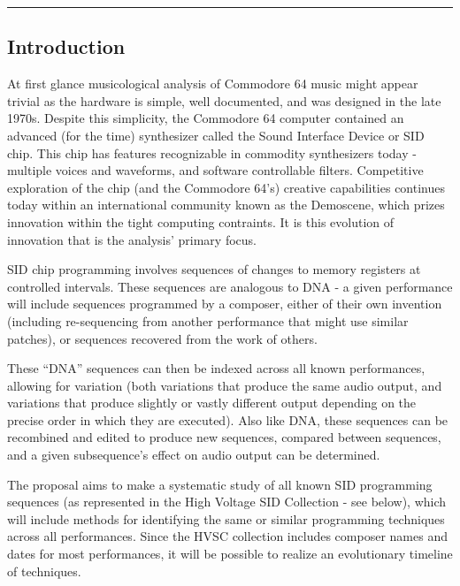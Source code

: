 \documentclass[10pt]{article}
\begin{document}
        \begin{center}
                \rule{150mm}{0.2mm}
        \end{center}

        \vspace{5mm}

\begin{multicols*}{2}

  \section{Introduction}
  At first glance musicological analysis of Commodore 64 music might
  appear trivial as the hardware is simple, well documented, and was
  designed in the late 1970s. Despite this simplicity, the
  Commodore 64 computer contained an advanced (for the time) synthesizer
  called the Sound Interface Device or SID chip. This chip has features
  recognizable in commodity synthesizers today - multiple voices and
  waveforms, and software controllable filters. Competitive
  exploration of the chip (and the Commodore 64's) creative capabilities
  continues today within an international community known as the Demoscene,
  which prizes innovation within the tight computing contraints. It is this
  evolution of innovation that is the analysis' primary focus.

  SID chip programming involves sequences of changes to memory
  registers at controlled intervals. These sequences are analogous to
  DNA - a given performance will include sequences programmed by a
  composer, either of their own invention (including re-sequencing
  from another performance that might use similar patches), or
  sequences recovered from the work of others.

  These ``DNA'' sequences can then be indexed across all known
  performances, allowing for variation (both variations that produce
  the same audio output, and variations that produce slightly or
  vastly different output depending on the precise order in which they
  are executed). Also like DNA, these sequences can be recombined and
  edited to produce new sequences, compared between sequences, and a
  given subsequence's effect on audio output can be determined.

  The proposal aims to make a systematic study of all known SID
  programming sequences (as represented in the High Voltage SID
  Collection - see below), which will include methods for identifying
  the same or similar programming techniques across all
  performances. Since the HVSC collection includes composer names and dates
  for most performances, it will be possible to realize an
  evolutionary timeline of techniques.


\end{multicols*}
\end{document}
